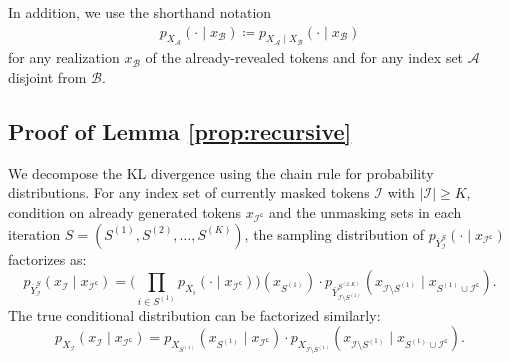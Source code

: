 \documentclass[english]{article}
\newcommand{\defn}{\coloneqq}
\newcommand{\cA}{\mathcal{A}}
\newcommand{\cB}{\mathcal{B}}
\newcommand{\cI}{\mathcal{I}}
\newcommand{\ol}{\overline}
\begin{document}
In addition, we use the shorthand notation
\begin{align*}
p_{X_\cA}(\cdot \mid x_{\cB}) \defn p_{X_\cA \mid X_{\cB}}(\cdot \mid x_{\cB})
\end{align*}
for any realization $x_{\cB}$ of the already-revealed tokens and for any index set $\cA $ disjoint from $\cB$.


\subsection{Proof of Lemma \ref{prop:recursive}}
\label{sec:proof-prop-recursive}
We decompose the KL divergence using the chain rule for probability distributions.
For any index set of currently masked tokens $\cI$ with $|\cI| \geq K$, condition on already generated tokens $x_{\cI^\mathsf{c}}$ and the unmasking sets in each iteration $ S = (S^{(1)}, S^{(2)}, \ldots, S^{(K)}) $, the sampling distribution of $ p_{\ol Y_{\cI}^S}(\cdot \mid x_{\cI^\mathsf{c}}) $ factorizes as:
\[
    p_{\ol Y_{\cI}^S}(x_{\cI} \mid x_{\cI^\mathsf{c}}) = \Big(\prod_{i \in S^{(1)}} p_{X_i}(\cdot \mid x_{\cI^\mathsf{c}})\Big)(x_{S^{(1)}}) \cdot p_{\ol Y_{\cI \setminus S^{(1)}}^{S^{(2:K)}}}(x_{\cI \setminus S^{(1)}} \mid x_{S^{(1)} \cup \cI^\mathsf{c}}).
\]
The true conditional distribution can be factorized similarly:
\[
    p_{X_{\cI}}(x_{\cI} \mid x_{\cI^\mathsf{c}}) = p_{X_{S^{(1)}}} (x_{S^{(1)}} \mid x_{\cI^\mathsf{c}}) \cdot p_{X_{\cI \setminus S^{(1)}}}(x_{\cI \setminus S^{(1)}} \mid x_{S^{(1)} \cup \cI^\mathsf{c}}).
\]
\end{document}
